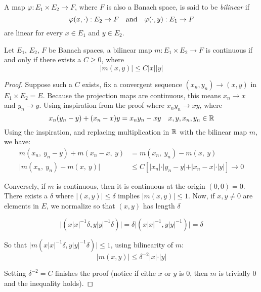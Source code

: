 \documentclass[../main-v2-manifolds.tex]{subfiles}
\begin{document}
%
%
%
\newpage
{}
\begin{definition}
A map $\varphi: E_1\times E_2\to F$, where $F$ is also a Banach space, is said to be \emph{bilinear} if
\[
    \varphi(x,\cdot): E_2\to F\qqtext{and}\varphi(\cdot,y): E_1\to F
\]
are linear for every $x\in E_1$ and $y\in E_2$.     
\end{definition}


\begin{wts}\label{prop:characterization-of-continuity-bilinear-map}
    Let $E_1$, $E_2$, $F$ be Banach spaces, a bilinear map $m: E_1\times E_2\to F$ is continuous if and only if there exists a $C\geq 0$, where
    \begin{equation}\label{eq:continuity-bilinear-map}
        \vert m(x,y)\vert\leq C\vert x\vert\vert y\vert    
    \end{equation}
\end{wts}
\begin{proof}
    Suppose such a $C$ exists, fix a convergent sequence $(x_n, y_n)\to (x,y)$ in $E_1\times E_2 = E$. Because the projection maps are continuous, this means $x_n\to x$ and $y_n\to y$. Using inspiration from the proof where $x_ny_n\to xy$, where
    \[
        x_n(y_n-y) + (x_n-x)y = x_ny_n- xy\quad x,y,x_n,y_n\in\mathbb{R}
    \]
    Using the inspiration, and replacing multiplication in $\mathbb{R}$ with the bilinear map $m$, we have:
    \begin{align*}
        m(x_n,\: y_n-y) + m(x_n-x,\: y) &= m(x_n,\:y_n) - m(x,\:y)\\
        \vert m(x_n,\: y_n) - m(x,\: y)\vert &\leq C[\vert x_n\vert\cdot\vert y_n - y\vert + \vert x_n - x\vert\cdot\vert y\vert]\to 0
    \end{align*}

    Conversely, if $m$ is continuous, then it is continuous at the origin $(0,0)=0$. There exists a $\delta$ where $\vert (x,y)\vert \leq \delta$ implies $\vert m(x,y)\vert \leq 1$. Now, if $x,y\neq 0$ are elements in $E$, we normalize so that $(x,y)$ has length $\delta$

    \[
        \vert(x\vert x\vert^{-1}\delta,y\vert y\vert^{-1}\delta)\vert = \delta\vert(x\vert x\vert^{-1},y\vert y\vert^{-1})\vert = \delta
    \]

    So that $\vert m(x\vert x\vert^{-1}\delta, y\vert y\vert^{-1}\delta)\vert \leq 1$, using bilinearity of $m$:
    \[
        \vert m(x,y)\vert\leq \delta^{-2}\vert x\vert\cdot\vert y\vert
    \]

    Setting $\delta^{-2} = C$ finishes the proof (notice if eithe $x$ or $y$ is $0$, then $m$ is trivially $0$ and the inequality holds).
\end{proof}
\end{document}
